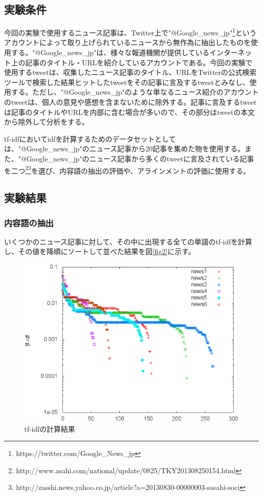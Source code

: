 \documentclass[12pt]{jarticle}
\begin{document}
\subsection{実験条件}
今回の実験で使用するニュース記事は、Twitter上で"@Google\_news\_jp"\footnote{https://twitter.com/Google\_News\_jp}というアカウントによって取り上げられているニュースから無作為に抽出したものを使用する。"@Google\_news\_jp"は、様々な報道機関が提供しているインターネット上の記事のタイトル・URLを紹介しているアカウントである。今回の実験で使用するtweetは、収集したニュース記事のタイトル、URLをTwitterの公式検索ツールで検索した結果ヒットしたtweetをその記事に言及するtweetとみなし、使用する。ただし、"@Google\_news\_jp"のような単なるニュース紹介のアカウントのtweetは、個人の意見や感想を含まないために除外する。記事に言及するtweetは記事のタイトルやURLを内部に含む場合が多いので、その部分はtweetの本文から除外して分析をする。

tf-idfにおいてidfを計算するためのデータセットとしては、"@Google\_news\_jp"のニュース記事から20記事を集めた物を使用する。また、"@Google\_news\_jp"のニュース記事から多くのtweetに言及されている記事を二つ\footnote{http://www.asahi.com/national/update/0825/TKY201308250154.html}\footnote{http://zasshi.news.yahoo.co.jp/article?a=20130830-00000003-sasahi-soci}を選び、内容語の抽出の評価や、アラインメントの評価に使用する。

\subsection{実験結果}
\subsubsection{内容語の抽出}

いくつかのニュース記事に対して、その中に出現する全ての単語のtf-idfを計算し、その値を降順にソートして並べた結果を図\ref{fig2}に示す。

\begin{figure}[htbp]
  \begin{center}
    \includegraphics[scale = 0.5]{image/content_word.eps}
  \end{center}
  \caption{tf-idfの計算結果}

\end{figure}
\end{document}
